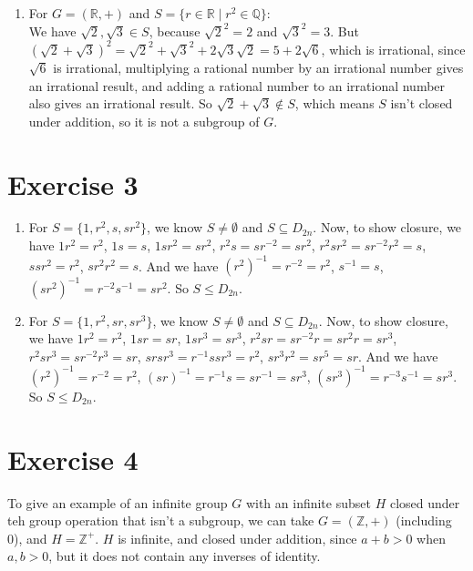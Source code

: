 \documentclass{article}
\newcommand{\Z}{\mathbb{Z}}
\newcommand{\Q}{\mathbb{Q}}
\newcommand{\R}{\mathbb{R}}
\begin{document}
\begin{enumerate}[label=\textbf{\alph*.}]
        \item 
            For $G = (\R, +)$
            and $S = \{r \in \R \mid r^2 \in \Q\}:$ \\
            We have $\sqrt{2}, \sqrt{3} \in S$,
            because $\sqrt{2}^2 = 2$ and $\sqrt{3}^2 = 3$.
            But $(\sqrt{2} + \sqrt{3})^2
            = \sqrt{2}^2 + \sqrt{3}^2 + 2\sqrt{3}\sqrt{2}
            = 5 + 2\sqrt{6}$, which is irrational,
            since $\sqrt{6}$ is irrational,
            multiplying a rational number by an irrational number
            gives an irrational result,
            and adding a rational number to an irrational number also
            gives an irrational result.
            So $\sqrt{2} + \sqrt{3} \notin S$,
            which means $S$ isn't closed under addition,
            so it is not a subgroup of $G$.
    \end{enumerate}


    \section*{Exercise 3}
    \begin{enumerate}[label=\textbf{\alph*.}]
        \item 
            For $S = \{1, r^2, s, sr^2\}$,
            we know $S \neq \emptyset$ and $S \subseteq D_{2n}$.
            Now, to show closure, we have
            $1r^2 = r^2$, $1s = s$, $1sr^2 = sr^2$,
            $r^2s = sr^{-2} = sr^2$, $r^2sr^2 = sr^{-2}r^2 = s$,
            $ssr^2 = r^2$, $sr^2r^2 = s$.
            And we have $(r^2)^{-1} = r^{-2} = r^2$,
            $s^{-1} = s$, $(sr^2)^{-1} = r^{-2}s^{-1} = sr^2$.
            So $S \leqslant D_{2n}$.
        \item
            For $S = \{1, r^2, sr, sr^3\}$,
            we know $S \neq \emptyset$ and $S \subseteq D_{2n}$.
            Now, to show closure, we have
            $1r^2 = r^2$, $1sr = sr$, $1sr^3 = sr^3$,
            $r^2sr = sr^{-2}r = sr^2r = sr^3$, $r^2sr^3 = sr^{-2}r^3 = sr$,
            $srsr^3 = r^{-1}ssr^3 = r^2$, $sr^3r^2 = sr^5 = sr$.
            And we have $(r^2)^{-1} = r^{-2} = r^2$,
            $(sr)^{-1} = r^{-1}s = sr^{-1} = sr^3$,
            $(sr^3)^{-1} = r^{-3}s^{-1} = sr^3$.
            So $S \leqslant D_{2n}$.
    \end{enumerate}


    \section*{Exercise 4}
    To give an example of an infinite group $G$ with an infinite subset $H$
    closed under teh group operation that isn't a subgroup,
    we can take $G = (\Z, +)$ (including 0),
    and $H = \Z^+$. 
    $H$ is infinite, and closed under addition,
    since $a + b > 0$ when $a,b > 0$,
    but it does not contain any inverses of identity.
\end{document}
